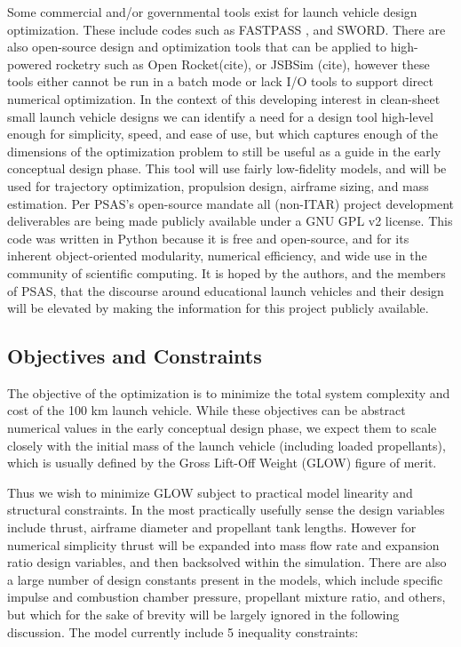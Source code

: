 \documentclass[]{aiaa-tc}%
\begin{document}
Some commercial and/or governmental tools exist for launch vehicle design optimization. These include codes such as FASTPASS \cite{Fastpass}, and SWORD\cite{SWORD}. There are also open-source design and optimization tools that can be applied to high-powered rocketry such as Open Rocket(cite), or JSBSim (cite), however these tools either cannot be run in a batch mode or lack I/O tools to support direct numerical optimization. In the context of this developing interest in clean-sheet small launch vehicle designs we can identify a need for a design tool high-level enough for simplicity, speed, and ease of use, but which captures enough of the dimensions of the optimization problem to still be useful as a guide in the early conceptual design phase. This tool will use fairly low-fidelity models, and will be used for trajectory optimization, propulsion design, airframe sizing, and mass estimation. Per PSAS’s open-source mandate all (non-ITAR) project development deliverables are being made publicly available under a GNU GPL v2 license\cite{Git}. This code was written in Python because it is free and open-source, and for its inherent object-oriented modularity, numerical efficiency, and wide use in the community of scientific computing. It is hoped by the authors, and the members of PSAS, that the discourse around educational launch vehicles and their design will be elevated by making the information for this project publicly available.

\subsection{Objectives and Constraints}
The objective of the optimization is to minimize the total system complexity and cost of the 100 km launch vehicle. While these objectives can be abstract numerical values in the early conceptual design phase, we expect them to scale closely with the initial mass of the launch vehicle (including loaded propellants), which is usually defined by the Gross Lift-Off Weight (GLOW) figure of merit.  

Thus we wish to minimize GLOW subject to practical model linearity and structural constraints. In the most practically usefully sense the design variables include thrust, airframe diameter and propellant tank lengths. However for numerical simplicity thrust will be expanded into mass flow rate and expansion ratio design variables, and then backsolved within the simulation. There are also a large number of design constants present in the models, which include specific impulse and combustion chamber pressure, propellant mixture ratio, and others, but which for the sake of brevity will be largely ignored in the following discussion. The model currently include 5 inequality constraints:
\end{document}
